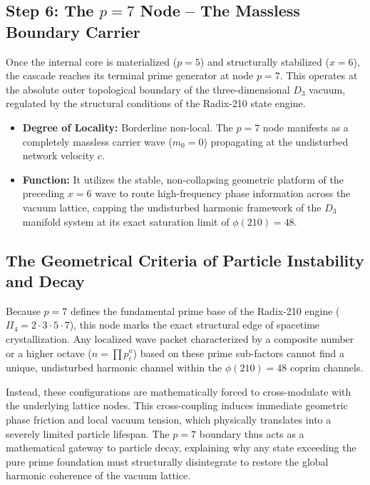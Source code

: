 \documentclass[11pt,a4paper]{article}
\theoremstyle{plain}
\theoremstyle{definition}
\theoremstyle{remark}
\begin{document}
\subsection{Step 6: The $p=7$ Node – The Massless Boundary Carrier}
Once the internal core is materialized ($p=5$) and structurally stabilized ($x=6$), the cascade reaches its terminal prime generator at node $p=7$. This operates at the absolute outer topological boundary of the three-dimensional $D_3$ vacuum, regulated by the structural conditions of the Radix-210 state engine.
\begin{itemize}
    \item \textbf{Degree of Locality:} Borderline non-local. The $p=7$ node manifests as a completely massless carrier wave ($m_0 = 0$) propagating at the undisturbed network velocity $c$.
    \item \textbf{Function:} It utilizes the stable, non-collapsing geometric platform of the preceding $x=6$ wave to route high-frequency phase information across the vacuum lattice, capping the undisturbed harmonic framework of the $D_3$ manifold system at its exact saturation limit of $\phi(210)=48$.
\end{itemize}

\newpage
\subsection{The Geometrical Criteria of Particle Instability and Decay}
Because $p=7$ defines the fundamental prime base of the Radix-210 engine ($\Pi_4 = 2 \cdot 3 \cdot 5 \cdot 7$), this node marks the exact structural edge of spacetime crystallization. Any localized wave packet characterized by a composite number or a higher octave ($n = \prod p_i^a$) based on these prime sub-factors cannot find a unique, undisturbed harmonic channel within the $\phi(210) = 48$ coprim channels.

Instead, these configurations are mathematically forced to cross-modulate with the underlying lattice nodes. This cross-coupling induces immediate geometric phase friction and local vacuum tension, which physically translates into a severely limited particle lifespan. The $p=7$ boundary thus acts as a mathematical gateway to particle decay, explaining why any state exceeding the pure prime foundation must structurally disintegrate to restore the global harmonic coherence of the vacuum lattice.
\end{document}
